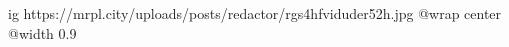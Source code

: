  
 
 
 
 

\ifcmt
  ig https://mrpl.city/uploads/posts/redactor/rgs4hfviduder52h.jpg
  @wrap center
  @width 0.9
\fi
